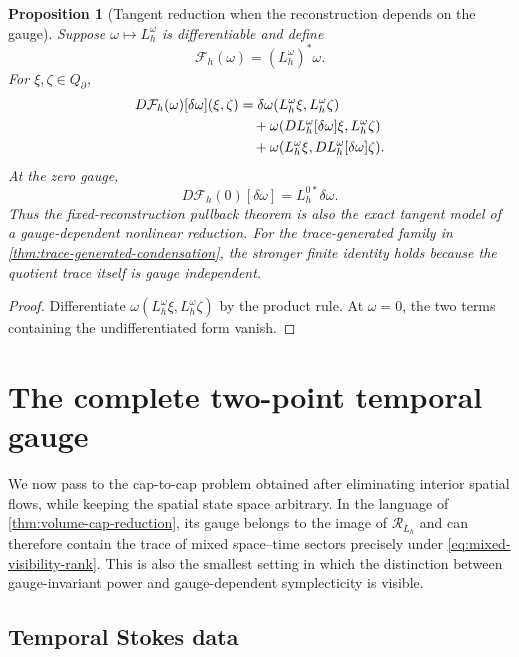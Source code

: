 \documentclass[11pt,a4paper]{article}
\newtheorem{proposition}[theorem]{Proposition}
\begin{document}
\begin{proposition}[Tangent reduction when the reconstruction depends on the gauge]
\label{prop:gauge-dependent-tangent}
Suppose \(\omega\mapsto L_h^\omega\) is differentiable and define
\[
 \mathcal F_h(\omega)=(L_h^\omega)^*\omega.
\]
For \(\xi,\zeta\in Q_\partial\),
\begin{align}
 D\mathcal F_h(\omega)[\delta\omega](\xi,\zeta)
 &=\delta\omega(L_h^\omega\xi,L_h^\omega\zeta)\notag\\
 &\quad+\omega(DL_h^\omega[\delta\omega]\xi,L_h^\omega\zeta)\notag\\
 &\quad+\omega(L_h^\omega\xi,DL_h^\omega[\delta\omega]\zeta).
 \label{eq:gauge-dependent-differential}
\end{align}
At the zero gauge,
\begin{equation}\label{eq:tangent-pullback}
 D\mathcal F_h(0)[\delta\omega]=L_h^{0*}\delta\omega.
\end{equation}
Thus the fixed-reconstruction pullback theorem is also the exact tangent
model of a gauge-dependent nonlinear reduction.  For the trace-generated
family in \cref{thm:trace-generated-condensation}, the stronger finite
identity holds because the quotient trace itself is gauge independent.
\end{proposition}

\begin{proof}
Differentiate
\(\omega(L_h^\omega\xi,L_h^\omega\zeta)\) by the product rule.  At
\(\omega=0\), the two terms containing the undifferentiated form vanish.
\end{proof}

\section{The complete two-point temporal gauge}

We now pass to the cap-to-cap problem obtained after eliminating interior
spatial flows, while keeping the spatial state space arbitrary.  In the
language of \cref{thm:volume-cap-reduction}, its gauge belongs to the image
of \(\mathcal R_{L_h}\) and can therefore contain the trace of mixed
space--time sectors precisely under \cref{eq:mixed-visibility-rank}.  This
is also the smallest setting in which the distinction between
gauge-invariant power and gauge-dependent symplecticity is visible.

\subsection{Temporal Stokes data}
\end{document}
